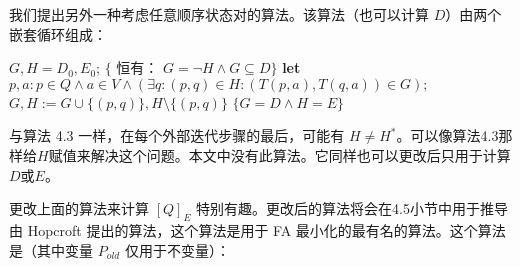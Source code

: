 我们提出另外一种考虑任意顺序状态对的算法。该算法（也可以计算 $D$）由两个嵌套循环组成：

\begin{algorithm}
    \caption{}\label{al:4-5}
    \begin{algorithmic}[1]
        \State $G,H=D_0,E_0$; 
        \State $\{$ 恒有： $G= \neg H \land G \subseteq D \} $
            \State \textbf{let} $p,a:p\in Q \land a \in V \land ( \exists q : (p,q) \in H : (T(p,a),T(q,a)) \in G );$
                \State $ G,H := G \cup \{ (p,q) \},H \setminus \{ (p,q) \} $
            \EndFor
        \Until $\{  G=D \land H=E \}$
    \end{algorithmic}
\end{algorithm}

与算法 4.3 一样，在每个外部迭代步骤的最后，可能有 $H \not= H^*$。可以像算法4.3那样给$H$赋值来解决这个问题。本文中没有此算法。它同样也可以更改后只用于计算$D$或$E$。

更改上面的算法来计算 $[Q]_E$ 特别有趣。更改后的算法将会在4.5小节中用于推导由 Hopcroft 提出的算法，这个算法是用于 FA 最小化的最有名的算法。这个算法是（其中变量 $P_{old}$ 仅用于不变量）：

